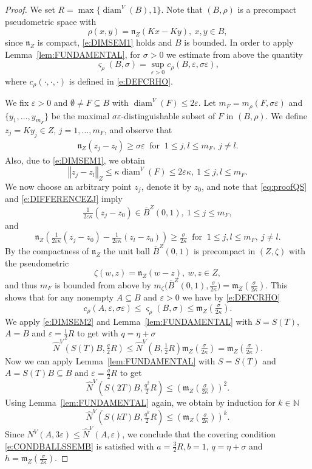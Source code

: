 \documentclass[a4paper,12pt,reqno]{amsart}
\theoremstyle{plain}
\theoremstyle{definition}
\numberwithin{equation}{section}
\newcommand{\N}{\mathbb{N}}
\newcommand{\norm}[1]{\left\Vert#1\right\Vert}
\newcommand{\eps}{\varepsilon}
\newcommand{\diam}{\operatorname{diam}}
\renewcommand{\geq}{\geqslant}
\renewcommand{\leq}{\leqslant}
\begin{document}
\begin{proof}
We set
$R=\max\{\diam^{V}(B),1\}$.
Note that $(B,\rho)$ is a precompact pseudometric space with
$$\rho(x,y)=\mathfrak{n}_{Z}(Kx-Ky),\ x,y\in B,$$
since $\mathfrak{n}_{Z}$ is compact, \eqref{e:DIMSEM1} holds
and $B$ is bounded.
In order to apply Lemma~\ref{lem:FUNDAMENTAL}, for $\sigma>0$ we estimate from above
the quantity
$$\varsigma_{\rho}(B,\sigma)=\sup_{\eps>0}c_{\rho}(B,\eps,\sigma\eps),$$
where $c_{\rho}(\cdot,\cdot,\cdot)$ is defined in \eqref{e:DEFCRHO}.

We fix $\eps>0$ and $\emptyset\neq F\subseteq B$ with
$\diam^{V}(F)\leq 2\eps$.
Let $m_{F}=m_{\rho}(F,\sigma\eps)$ and $\{y_1,\ldots,y_{m_{F}}\}$
be the maximal $\sigma\eps$-distinguishable subset of $F$ in $(B,\rho)$.
We define  $z_{j}= Ky_j\in Z$, $j=1,\ldots, m_{F}$, and observe that
\begin{align}\label{eq:proofQS}
\mathfrak{n}_{Z}(z_j-z_l)\geq\sigma\eps\ \text{ for }\ 1\leq j,l\leq m_F,\ j\neq l.
\end{align}
Also, due to \eqref{e:DIMSEM1}, we obtain
\begin{equation}\label{e:DIFFERENCEZJ}
\norm{z_j-z_l}_{Z}\leq \kappa\diam^{V}(F)\leq 2\eps \kappa,\ 1\leq j,l\leq m_F.
\end{equation}
We now choose an arbitrary point $z_j$, denote it by $z_0$, and
note that \eqref{eq:proofQS} and \eqref{e:DIFFERENCEZJ} imply
$$\tfrac{1}{2\eps\kappa}(z_j-z_0)\in\overline{B}^{Z}(0,1),\ 1\leq j\leq m_F,$$
and
$$\mathfrak{n}_{Z}\left(\tfrac{1}{2\eps\kappa}(z_j-z_0)-\tfrac{1}{2\eps\kappa}(z_l-z_0)\right)\geq\tfrac{\sigma}{2\kappa}\ \text{ for }\ 1\leq j,l\leq m_F,\ j\neq l.$$
By the compactness of $\mathfrak{n}_{Z}$ the unit ball $\overline{B}^{Z}(0,1)$
is precompact in $(Z,\zeta)$ with the pseudometric
$$\zeta(w,z)=\mathfrak{n}_{Z}(w-z),\ w,z\in Z,$$
and thus $m_F$ is bounded from above by $m_{\zeta}\big(\overline{B}^{Z}(0,1),\frac{\sigma}{2\kappa}\big)=\mathfrak{m}_{Z}\left(\frac{\sigma}{2\kappa}\right)$.
This shows that for any nonempty $A\subseteq B$ and $\eps>0$ we have by \eqref{e:DEFCRHO}
$$c_{\rho}(A,\eps,\sigma\eps)\leq\varsigma_{\rho}(B,\sigma)\leq\mathfrak{m}_{Z}\left(\tfrac{\sigma}{2\kappa}\right).$$
We apply \eqref{e:DIMSEM2} and Lemma~\ref{lem:FUNDAMENTAL} with $S=S(T)$, $A=B$
and $\eps=\frac{1}{2}R$ to get with $q=\eta+\sigma$
$$\widehat{N}^{V}(S(T)B,\tfrac{q}{2}R)\leq\widehat{N}^{V}(B,\tfrac{1}{2}R)\mathfrak{m}_{Z}\left(\tfrac{\sigma}{2\kappa}\right)=\mathfrak{m}_{Z}\left(\tfrac{\sigma}{2\kappa}\right).$$
Now we can apply Lemma~\ref{lem:FUNDAMENTAL} with $S=S(T)$
and $A=S(T)B\subseteq B$ and $\eps=\frac{q}{2}R$ to get
$$\widehat{N}^{V}(S(2T)B, \tfrac{q^2}{2}R)\leq (\mathfrak{m}_{Z}\left(\tfrac{\sigma}{2\kappa}\right))^{2}.$$
Using Lemma~\ref{lem:FUNDAMENTAL} again, we obtain by induction for $k\in\N$
$$\widehat{N}^{V}(S(kT)B, \tfrac{q^{k}}{2} R)\leq
\left(\mathfrak{m}_{Z}\left(\tfrac{\sigma}{2\kappa}\right)\right)^{k}.$$
Since $N^{V}(A,3\eps)\leq\widehat{N}^{V}(A,\eps)$, we conclude that
the covering condition \eqref{e:CONDBALLSSEMB} is satisfied with $a=\frac{3}{2}R, b=1$, $q=\eta+\sigma$ and $h=\mathfrak{m}_{Z}\left(\frac{\sigma}{2\kappa}\right)$. 
\end{proof}
\end{document}
